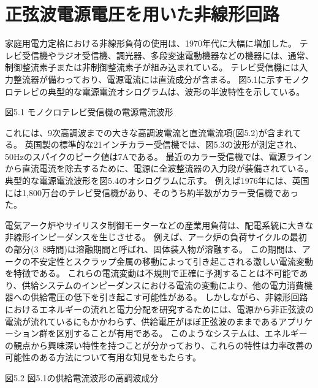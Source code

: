 \documentclass[fleqn,11pt,a4paper,dvipdfmx]{jsarticle}
\begin{document}
%
%
\section{正弦波電源電圧を用いた非線形回路}

家庭用電力定格における非線形負荷の使用は、1970年代に大幅に増加した。
テレビ受信機やラジオ受信機、調光器、多段変速電動機器などの機器には、通常、制御整流素子または非制御整流素子が組み込まれている。
テレビ受信機には入力整流器が備わっており、電源電流には直流成分が含まる。
図5.1に示すモノクロテレビの典型的な電源電流オシログラムは、波形の半波特性を示している。

図5.1 モノクロテレビ受信機の電源電流波形

これには、9次高調波までの大きな高調波電流と直流電流項(図5.2)が含まれてる。
英国製の標準的な21インチカラー受信機では、図5.3の波形が測定され、50Hzのスパイクのピーク値は7Aである。
最近のカラー受信機では、電源ラインから直流電流を除去するために、電源に全波整流器の入力段が装備されている。
典型的な電源電流波形を図5.4のオシログラムに示す。
例えば1976年には、英国には1,800万台のテレビ受信機があり、そのうち約半数がカラー受信機であった。

電気アーク炉やサイリスタ制御モーターなどの産業用負荷は、配電系統に大きな非線形インピーダンスを生じさせる。
例えば、アーク炉の負荷サイクルの最初の部分(3~8時間)は溶融期間と呼ばれ、固体装入物が溶融する。
この期間は、アークの不安定性とスクラップ金属の移動によって引き起こされる激しい電流変動を特徴である。
これらの電流変動は不規則で正確に予測することは不可能であり、供給システムのインピーダンスにおける電流の変動により、他の電力消費機器への供給電圧の低下を引き起こす可能性がある。
しかしながら、非線形回路におけるエネルギーの流れと電力分配を研究するためには、電源から非正弦波の電流が流れているにもかかわらず、供給電圧がほぼ正弦波のままであるアプリケーション群を区別することが有用である。
このようなシステムは、エネルギーの観点から興味深い特性を持つことが分かっており、これらの特性は力率改善の可能性のある方法について有用な知見をもたらす。

図5.2 図5.1の供給電流波形の高調波成分


\newpage


%
%
\end{document}
